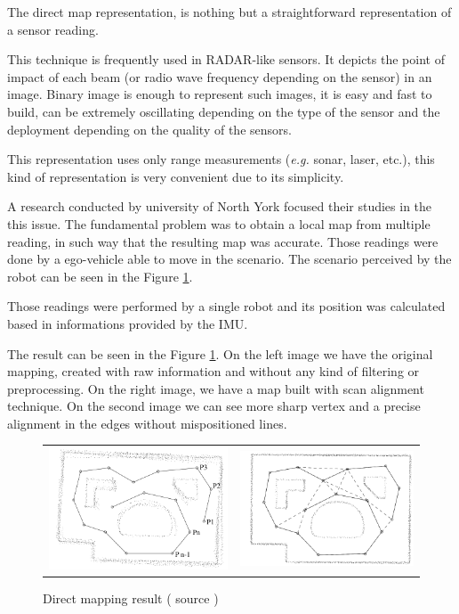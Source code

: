 The direct map representation, is nothing but a straightforward representation of a sensor reading. 

This technique is frequently used in RADAR-like sensors. It depicts the point of impact of each beam (or radio wave frequency depending on the sensor) in an image. Binary image is enough to represent such images, it is easy and fast to build, can be extremely oscillating depending on the type of the sensor and the deployment depending on the quality of the sensors.

This representation uses only range measurements (\textit{e.g.} sonar, laser, etc.), this kind of representation is very convenient due to its simplicity. 

A research conducted by university of North York \cite{Lu:1997:GCR:591441.591464} focused their studies in the this issue. The fundamental problem was to obtain a local map from multiple reading, in such way that the resulting map was accurate. Those readings were done by a ego-vehicle able to move in the scenario. The scenario perceived by the robot can be seen in the Figure \ref{fig:mapping:direct:result}.

Those readings were performed by a single robot and its position was calculated based in informations provided by the IMU.

The result can be seen in the Figure \ref{fig:mapping:direct:result}. On the left image we have the original mapping, created with raw information and without any kind of filtering or preprocessing. On the right image, we have a map built with scan alignment technique\cite{Lu:1997:GCR:591441.591464}. On the second image we can see more sharp vertex and a precise alignment in the edges without mispositioned lines.

\begin{figure}[h]
\centering
	\begin{tabular}{lr}\\
		\includegraphics[width=0.5\columnwidth]{img/fig:mapping:direct:a} &
		\includegraphics[width=0.5\columnwidth]{img/fig:mapping:direct:b}
	\end{tabular}
	\caption{Direct mapping result ( source \cite{Lu:1997:GCR:591441.591464} )}
	\label{fig:mapping:direct:result}
\end{figure}

